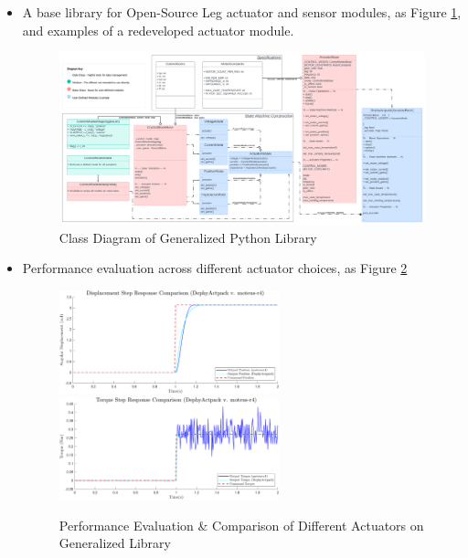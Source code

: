 \documentclass[12pt]{article}
\begin{document}
\begin{itemize}

    \item{A base library for Open-Source Leg actuator and sensor modules, as Figure \ref*{Python Lib Class Diagram}, and examples of a redeveloped actuator module.}
    
    \begin{figure}[H]
        \centering
        \includegraphics[width=1.0\textwidth]{portfolio/Class Diagram Base Lib.png}
        \caption{Class Diagram of Generalized Python Library}
        \label{Python Lib Class Diagram}
    \end{figure}
    \item {Performance evaluation across different actuator choices, as Figure \ref{Dephy-Moteus Comp}}
    
    \begin{figure}[H]
        \centering
        \includegraphics[width=0.6\textwidth]{portfolio/position_comp.png}
        \includegraphics[width=0.6\textwidth]{portfolio/torque_comp.png}
        \caption{Performance Evaluation \& Comparison of Different Actuators on Generalized Library}
        \label{Dephy-Moteus Comp}
    \end{figure}
    

\end{itemize}
\end{document}
